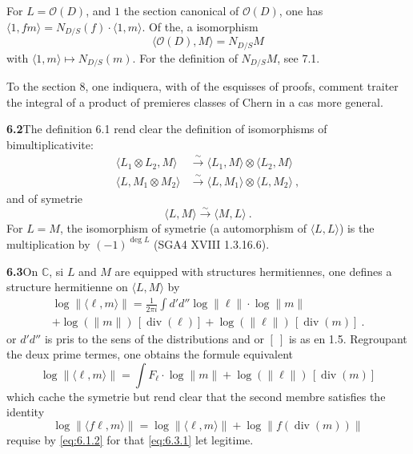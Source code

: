 \documentclass[12pt,a4paper]{article}
\theoremstyle{plain}
\theoremstyle{definition}
\theoremstyle{remark}
\DeclareMathOperator{\divm}{div}
\newcommand{\bbC}{\mathbb{C}}
\newcommand{\calO}{\mathcal{O}}
\newcommand{\simto}{\xrightarrow{\sim}}
\begin{document}
For $L = \calO(D)$, and $1$ the section canonical of $\calO(D)$, one has $\langle 1, fm \rangle = N_{D/S}(f) \cdot \langle 1, m \rangle$. Of the, a isomorphism
\begin{equation}
\label{eq:6.1.3}
\langle \calO(D), M \rangle = N_{D/S} M
\end{equation}
with $\langle 1, m \rangle \mapsto N_{D/S}(m)$. For the definition of $N_{D/S} M$, see 7.1.

To the section 8, one indiquera, with of the esquisses of proofs, comment traiter the integral of a product of premieres classes of Chern in a cas more general.

\medskip
\noindent\textbf{6.2}\quad The definition 6.1 rend clear the definition of isomorphisms of bimultiplicativite:
\begin{align*}
\langle L_1 \otimes L_2, M \rangle &\simto \langle L_1, M \rangle \otimes \langle L_2, M \rangle \\
\langle L, M_1 \otimes M_2 \rangle &\simto \langle L, M_1 \rangle \otimes \langle L, M_2 \rangle \ ,
\end{align*}
and of symetrie
\[
\langle L, M \rangle \simto \langle M, L \rangle \ .
\]
For $L = M$, the isomorphism of symetrie (a automorphism of $\langle L, L \rangle$) is the multiplication by $(-1)^{\deg L}$ (SGA4 XVIII 1.3.16.6).

\medskip
\noindent\textbf{6.3}\quad On $\bbC$, si $L$ and $M$ are equipped with structures hermitiennes, one defines a structure hermitienne on $\langle L, M \rangle$ by
\begin{equation}
\label{eq:6.3.1}
\begin{aligned}
\log \| \langle \ell, m \rangle \| = \frac{1}{2\pi i} \int d'd'' \log \|\ell\| \cdot \log \|m\| \\
+ \log(\|m\|) \, [\divm(\ell)] + \log(\|\ell\|) \, [\divm(m)] \ .
\end{aligned}
\end{equation}
or $d'd''$ is pris to the sens of the distributions and or $[\ ]$ is as en 1.5. Regroupant the deux prime termes, one obtains the formule equivalent
\begin{equation}
\label{eq:6.3.2}
\log \| \langle \ell, m \rangle \| = \int F_\ell \cdot \log \|m\| + \log(\|\ell\|) \, [\divm(m)]
\end{equation}
which cache the symetrie but rend clear that the second membre satisfies the identity
\[
\log \| \langle f\ell, m \rangle \| = \log \| \langle \ell, m \rangle \| + \log \|f(\divm(m))\|
\]
requise by \eqref{eq:6.1.2} for that \eqref{eq:6.3.1} let legitime.
\end{document}
